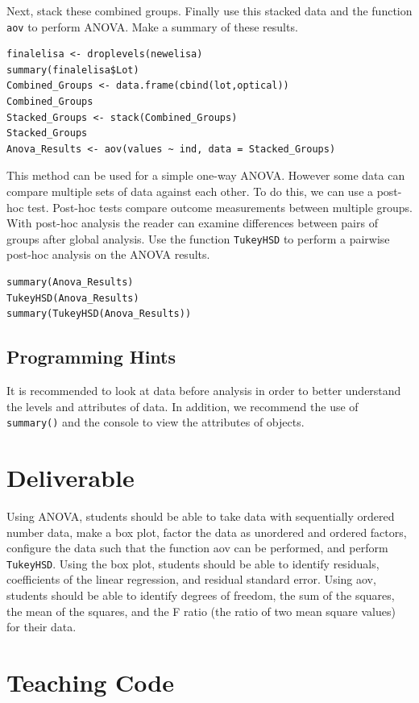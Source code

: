 Next, stack these combined groups.
Finally use this stacked data and the function \texttt{aov} to perform ANOVA.
Make a summary of these results.
\begin{lstlisting}
finalelisa <- droplevels(newelisa)
summary(finalelisa$Lot)
Combined_Groups <- data.frame(cbind(lot,optical))
Combined_Groups
Stacked_Groups <- stack(Combined_Groups)
Stacked_Groups
Anova_Results <- aov(values ~ ind, data = Stacked_Groups)
\end{lstlisting}
This method can be used for a simple one-way ANOVA.
However some data can compare multiple sets of data against each other.
To do this, we can use a post-hoc test.
Post-hoc tests compare outcome measurements between multiple groups.
With post-hoc analysis the reader can examine differences between pairs of groups after global analysis.
Use the function \texttt{TukeyHSD} to perform a pairwise post-hoc analysis on the ANOVA results.
\begin{lstlisting}
summary(Anova_Results)
TukeyHSD(Anova_Results)
summary(TukeyHSD(Anova_Results))
\end{lstlisting}
 \subsection{Programming Hints}
It is recommended to look at data before analysis in order to better understand the levels and attributes of data.
In addition, we recommend the use of \texttt{summary()} and the console to view the attributes of objects.
 
\section{Deliverable}

Using ANOVA, students should be able to take data with sequentially ordered number data, make a box plot, factor the data as unordered and ordered factors, configure the data such that the function aov can be performed, and perform \texttt{TukeyHSD}.
Using the box plot, students should be able to identify residuals, coefficients of the linear regression, and residual standard error. 
Using aov, students should be able to identify degrees of freedom, the sum of the squares, the mean of the squares, and the F ratio (the ratio of two mean square values) for their data. 

\section{Teaching Code}


